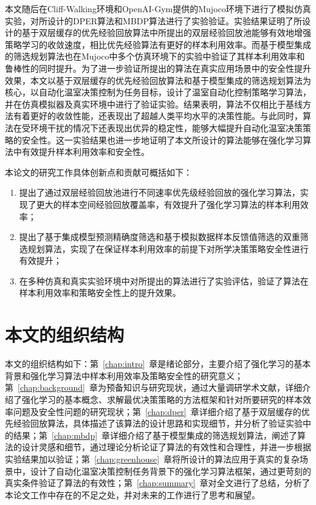 本文随后在Cliff-Walking环境和OpenAI-Gym提供的Mujoco环境下进行了模拟仿真实验，对所设计的DPER算法和MBDP算法进行了实验验证。实验结果证明了所设计的基于双层缓存的优先经验回放算法中所提出的双层经验回放池能够有效地增强策略学习的收敛速度，相比优先经验算法有更好的样本利用效率。而基于模型集成的筛选规划算法也在Mujoco中多个仿真环境下的实验中验证了其样本利用效率和鲁棒性的同时提升。为了进一步验证所提出的算法在真实应用场景中的安全性提升效果，本文以基于双层缓存的优先经验回放算法和基于模型集成的筛选规划算法为核心，以自动化温室决策控制为任务目标，设计了温室自动化控制策略学习算法，并在仿真模拟器及真实环境中进行了验证实验。结果表明，算法不仅相比于基线方法有着更好的收敛性能，还表现出了超越人类平均水平的决策性能。与此同时，算法在受环境干扰的情况下还表现出优异的稳定性，能够大幅提升自动化温室决策策略的安全性。这一实验结果也进一步地证明了本文所设计的算法能够在强化学习算法中有效提升样本利用效率和安全性。

本论文的研究工作具体创新点和贡献可概括如下：

\begin{enumerate}[1)]
    \item 提出了通过双层经验回放池进行不同速率优先级经验回放的强化学习算法，实现了更大的样本空间经验回放覆盖率，有效提升了强化学习算法的样本利用效率；
    \item 提出了基于集成模型预测精确度筛选和基于模拟数据样本反馈值筛选的双重筛选规划算法，实现了在保证样本利用效率的前提下对所学决策策略安全性进行有效提升；
    \item 在多种仿真和真实实验环境中对所提出的算法进行了实验评估，验证了算法在样本利用效率和策略安全性上的提升效果。
\end{enumerate}

\section{本文的组织结构}

本文的组织结构如下：第~\ref{chap:intro}~章是绪论部分，主要介绍了强化学习的基本背景和强化学习算法中样本利用效率及策略安全性的研究意义；第~\ref{chap:background}~章为预备知识与研究现状，通过大量调研学术文献，详细介绍了强化学习的基本概念、求解最优决策策略的方法框架和针对所要研究的样本效率问题及安全性问题的研究现状；第~\ref{chap:dper}~章详细介绍了基于双层缓存的优先经验回放算法，具体描述了该算法的设计思路和实现细节，并分析了验证实验中的结果；第~\ref{chap:mbdp}~章详细介绍了基于模型集成的筛选规划算法，阐述了算法的设计灵感和细节，通过理论分析论证了算法的有效性和合理性，并进一步根据实验结果加以验证；第~\ref{chap:greenhouse}~章将所设计的算法应用于真实的复杂场景中，设计了自动化温室决策控制任务背景下的强化学习算法框架，通过更苛刻的真实条件验证了算法的有效性；第~\ref{chap:summary}~章对全文进行了总结，分析了本论文工作中存在的不足之处，并对未来的工作进行了思考和展望。